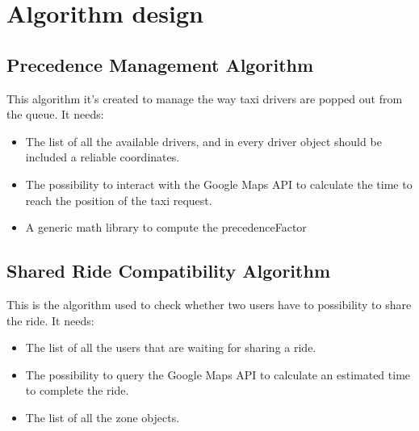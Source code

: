 

\section{Algorithm design} %
\label{sec:algorithm_design}


\subsection{Precedence Management Algorithm} %
\label{sub:first_algorithm}
This algorithm it's created to manage the way taxi drivers are popped out from the queue.
It needs:

\begin{itemize}
	\item The list of all the available drivers, and in every driver object should be included a reliable coordinates.
	\item The possibility to interact with the Google Maps API to calculate the time to reach the position of the taxi request.
	\item A generic math library to compute the precedenceFactor
\end{itemize}







\subsection{Shared Ride Compatibility Algorithm} %
\label{sub:second_algorithm}
This is the algorithm used to check whether two users have to possibility to share the ride.
It needs:
\begin{itemize}
	\item The list of all the users that are waiting for sharing a ride.
	\item The possibility to query the Google Maps API to calculate an estimated time to complete the ride.
	\item The list of all the zone objects.
\end{itemize}

